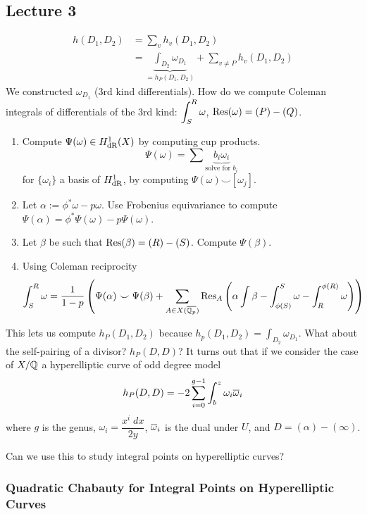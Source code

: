 \newpage
\subsection{Lecture 3}


	\[
	\begin{aligned}
	h(D_1,D_2)&= \sum_v h_v(D_1,D_2) \\
	&= \underbrace{\int_{D_2} \omega_{D_1}}_{= h_P(D_1,D_2)} + \sum_{v \neq P} h_v(D_1,D_2)
	\end{aligned}
	\]
We constructed $\omega_{D_1}$ (3rd kind differentials). How do we compute Coleman integrals of differentials of the 3rd kind: $\displaystyle \int_S^R \omega$, $\operatorname{Res}(\omega)= (P) - (Q)$.


\begin{enumerate}[1.]
\item Compute $\Psi(\omega) \in H^1_{\text{dR}}(X)$ by computing cup products.
	\[
	\Psi(\omega)= \sum \underbrace{b_i \omega_i}_{\text{solve for }b_i}
	\]
for $\{\omega_i\}$ a basis of $H^1_{\text{dR}}$, by computing $\Psi(\omega) \smile [\omega_j]$.

\item Let $\alpha:= \phi^* \omega - p\omega$. Use Frobenius equivariance to compute $\Psi(\alpha)= \phi^* \Psi(\omega) - p \Psi(\omega)$. 

\item Let $\beta$ be such that $\operatorname{Res}(\beta)= (R) - (S)$. Compute $\Psi(\beta)$. 

\item Using Coleman reciprocity
	\[
	\int_S^R \omega= \dfrac{1}{1-p} \left( \Psi(\alpha) \smile \Psi(\beta) + \sum_{A \in X(\overline{\mathbb{Q}_p})} \operatorname{Res}_A \left( \alpha \int \beta - \int_{\phi(S)}^S \omega - \int_R^{\phi(R)} \omega \right) \right)
	\]
\end{enumerate}


This lets us compute $h_P(D_1,D_2)$ because $h_p(D_1,D_2)= \int_{D_2} \omega_{D_1}$. What about the self-pairing of a divisor? $h_P(D,D)$? It turns out that if we consider the case of $X/\mathbb{Q}$ a hyperelliptic curve of odd degree model
	\[
	h_P(D,D)= -2 \sum_{i=0}^{g-1} \int_b^z \omega_i \overline{\omega}_i
	\]
where $g$ is the genus, $\omega_i= \dfrac{x^i \;dx}{2y}$, $\overline{\omega}_i$ is the dual under $U$, and $D= (\alpha) - (\infty)$. 


Can we use this to study integral points on hyperelliptic curves? 



\subsubsection{Quadratic Chabauty for Integral Points on Hyperelliptic Curves}

